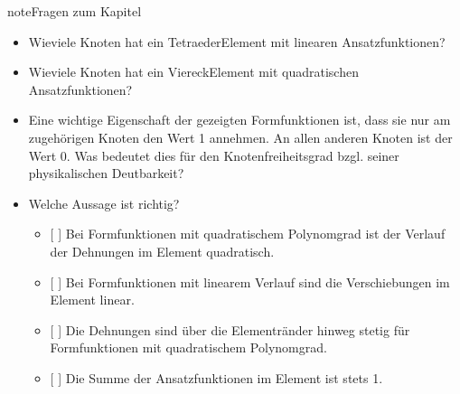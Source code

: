 \documentclass[letterpaper,10pt,german]{jupyterBook}
\begin{document}
\begin{sphinxadmonition}{note}{Fragen zum Kapitel}

\sphinxAtStartPar
{}
\begin{itemize}
\item {} 
\sphinxAtStartPar
Wieviele Knoten hat ein Tetraeder\sphinxhyphen{}Element mit linearen Ansatzfunktionen?

\item {} 
\sphinxAtStartPar
Wieviele Knoten hat ein Viereck\sphinxhyphen{}Element mit quadratischen Ansatzfunktionen?

\item {} 
\sphinxAtStartPar
Eine wichtige Eigenschaft der gezeigten Formfunktionen ist, dass sie nur am zugehörigen Knoten den Wert 1 annehmen. An allen anderen Knoten ist der Wert 0. Was bedeutet dies für den Knotenfreiheitsgrad bzgl. seiner physikalischen Deutbarkeit?

\item {} 
\sphinxAtStartPar
Welche Aussage ist richtig?
\begin{itemize}
\item {} 
\sphinxAtStartPar
{[} {]} Bei Formfunktionen mit quadratischem Polynomgrad ist der Verlauf der Dehnungen im Element quadratisch.

\item {} 
\sphinxAtStartPar
{[} {]} Bei Formfunktionen mit linearem Verlauf sind die Verschiebungen im Element linear.

\item {} 
\sphinxAtStartPar
{[} {]} Die Dehnungen sind über die Elementränder hinweg stetig für Formfunktionen mit quadratischem Polynomgrad.

\item {} 
\sphinxAtStartPar
{[} {]} Die Summe der Ansatzfunktionen im Element ist stets 1.

\end{itemize}

\end{itemize}
\end{sphinxadmonition}

\sphinxstepscope
\end{document}

